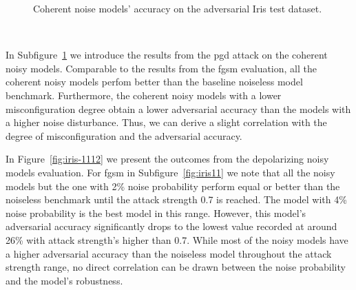 \begin{figure}[!h]
\begin{subfigure}{0.45\textwidth}
      \label{fig:iris10}
  \end{subfigure}
  \caption{Coherent noise models' accuracy on the adversarial Iris test dataset.}
  \label{fig:iris-910}
\end{figure} \

In Subfigure~\ref{fig:iris10} we introduce the results from the \ac{pgd}
attack on the coherent noisy models. Comparable to the results from the
\ac{fgsm} evaluation, all the coherent noisy models perfom better than
the baseline noiseless model benchmark. Furthermore, the coherent noisy
models with a lower misconfiguration degree obtain a lower adversarial
accuracy than the models with a higher noise disturbance. Thus, we can
derive a slight correlation with the degree of misconfiguration and the
adversarial accuracy. \

In Figure~\ref{fig:iris-1112} we present the outcomes from the depolarizing
noisy models evaluation. For \ac{fgsm} in Subfigure~\ref{fig:iris11}
we note that all the noisy models but the one with 2\% noise probability
perform equal or better than the noiseless benchmark until the attack
strength 0.7 is reached. The model with 4\% noise probability is the best
model in this range. However, this model's adversarial accuracy significantly
drops to the lowest value recorded at around 26\% with attack strength's
higher than 0.7. While most of the noisy models have a higher adversarial
accuracy than the noiseless model throughout the attack strength range,
no direct correlation can be drawn between the noise probability and the
model's robustness. \

